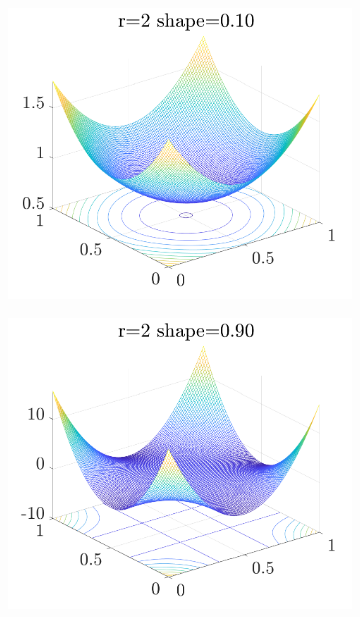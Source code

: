 \documentclass[twocolumn]{svjour3}          %
\begin{document}
\begin{figure}
	\centering
	\begin{subfigure}{0.40\textwidth}
		\includegraphics[width=\textwidth]{"fourier_kernel r_2 shape_10by100"}
	\end{subfigure}
	\centering
	\begin{subfigure}{0.40\textwidth}
		\includegraphics[width=\textwidth]{"fourier_kernel r_2 shape_90by100"}
	\end{subfigure}
	\centering
	\begin{subfigure}{0.40\textwidth}

\end{subfigure}
\end{figure}
\end{document}
